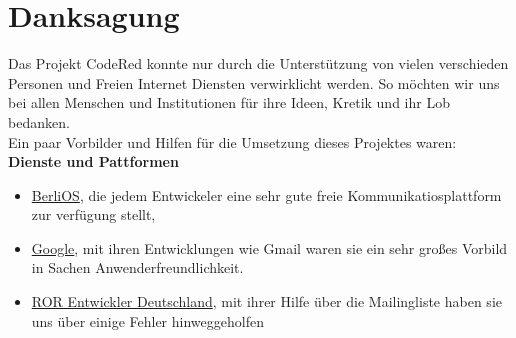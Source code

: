 \chapter{Danksagung}  %
\label{chapter:Danksagung}  %

Das Projekt CodeRed konnte nur durch die Unterstützung von vielen verschieden Personen und Freien Internet Diensten verwirklicht werden. So möchten wir uns bei allen Menschen und Institutionen für ihre Ideen, Kretik und ihr Lob bedanken. \\
Ein paar Vorbilder und Hilfen für die Umsetzung dieses Projektes waren: 
\\
\textbf{Dienste und Pattformen}
\begin{itemize}
\item \href{http://www.berlios.de}{BerliOS}, die jedem Entwickeler eine sehr gute freie Kommunikatiosplattform zur verfügung stellt,
\item \href{http://www.google.de}{Google}, mit ihren Entwicklungen wie Gmail waren sie ein sehr großes Vorbild in Sachen Anwenderfreundlichkeit. 
\item \href{http://rubyonrails.de}{ROR Entwickler Deutschland}, mit ihrer Hilfe über die Mailingliste haben sie uns über einige Fehler hinweggeholfen
\end{itemize}